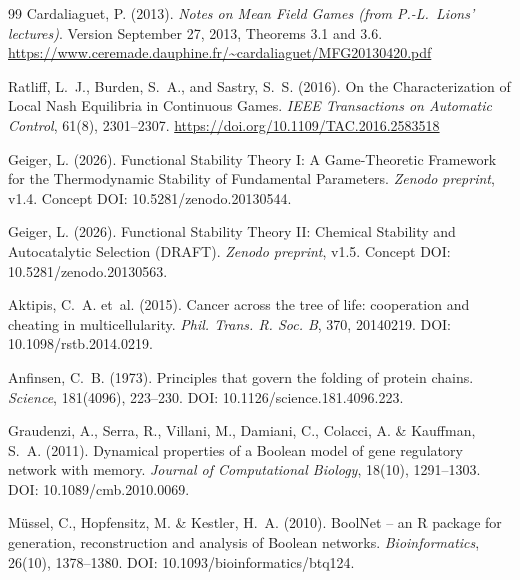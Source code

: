 \documentclass[12pt,a4paper]{article}
\theoremstyle{remark}
\begin{document}

\begin{thebibliography}{99}
Cardaliaguet, P. (2013).
\newblock \textit{Notes on Mean Field Games (from P.-L.\ Lions' lectures)}.
\newblock Version September 27, 2013, Theorems 3.1 and 3.6.
\newblock \url{https://www.ceremade.dauphine.fr/~cardaliaguet/MFG20130420.pdf}

Ratliff, L.~J., Burden, S.~A., and Sastry, S.~S. (2016).
\newblock On the Characterization of Local Nash Equilibria in Continuous Games.
\newblock \textit{IEEE Transactions on Automatic Control}, 61(8), 2301--2307.
\newblock \url{https://doi.org/10.1109/TAC.2016.2583518}



Geiger, L. (2026).
\newblock Functional Stability Theory I: A Game-Theoretic Framework for the Thermodynamic Stability of Fundamental Parameters.
\newblock \textit{Zenodo preprint}, v1.4.
\newblock Concept DOI: 10.5281/zenodo.20130544.

Geiger, L. (2026).
\newblock Functional Stability Theory II: Chemical Stability and Autocatalytic Selection (DRAFT).
\newblock \textit{Zenodo preprint}, v1.5.
\newblock Concept DOI: 10.5281/zenodo.20130563.

Aktipis, C.~A. et~al. (2015).
\newblock Cancer across the tree of life: cooperation and cheating in multicellularity.
\newblock \textit{Phil. Trans. R. Soc. B}, 370, 20140219.
\newblock DOI: 10.1098/rstb.2014.0219.

Anfinsen, C.~B. (1973).
\newblock Principles that govern the folding of protein chains.
\newblock \textit{Science}, 181(4096), 223--230.
\newblock DOI: 10.1126/science.181.4096.223.

Graudenzi, A., Serra, R., Villani, M., Damiani, C., Colacci, A. \& Kauffman, S.~A. (2011).
\newblock Dynamical properties of a Boolean model of gene regulatory network with memory.
\newblock \textit{Journal of Computational Biology}, 18(10), 1291--1303.
\newblock DOI: 10.1089/cmb.2010.0069.

Müssel, C., Hopfensitz, M. \& Kestler, H.~A. (2010).
\newblock BoolNet -- an R package for generation, reconstruction and analysis of Boolean networks.
\newblock \textit{Bioinformatics}, 26(10), 1378--1380.
\newblock DOI: 10.1093/bioinformatics/btq124.


\end{thebibliography}
\end{document}
